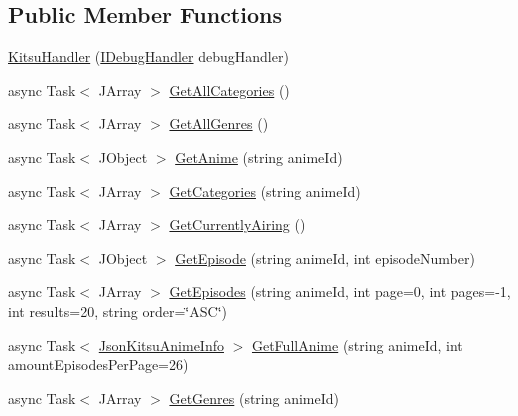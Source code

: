 \subsection*{Public Member Functions}
\begin{DoxyCompactItemize}
\item 
\mbox{\hyperlink{class_little_weeb_library_1_1_handlers_1_1_kitsu_handler_a92f980060f9277a512dfda67768a7428}{Kitsu\+Handler}} (\mbox{\hyperlink{interface_little_weeb_library_1_1_handlers_1_1_i_debug_handler}{I\+Debug\+Handler}} debug\+Handler)
\item 
async Task$<$ J\+Array $>$ \mbox{\hyperlink{class_little_weeb_library_1_1_handlers_1_1_kitsu_handler_ae329f7e735a6abee2734bbbd13d121b2}{Get\+All\+Categories}} ()
\item 
async Task$<$ J\+Array $>$ \mbox{\hyperlink{class_little_weeb_library_1_1_handlers_1_1_kitsu_handler_a528491d8d97584b2ba2c3bfcc4b5772e}{Get\+All\+Genres}} ()
\item 
async Task$<$ J\+Object $>$ \mbox{\hyperlink{class_little_weeb_library_1_1_handlers_1_1_kitsu_handler_a4c88ed25befe2904416b4d90673a8f82}{Get\+Anime}} (string anime\+Id)
\item 
async Task$<$ J\+Array $>$ \mbox{\hyperlink{class_little_weeb_library_1_1_handlers_1_1_kitsu_handler_a8d6a49dd26f66dd33ea2e2b4e9b330cb}{Get\+Categories}} (string anime\+Id)
\item 
async Task$<$ J\+Array $>$ \mbox{\hyperlink{class_little_weeb_library_1_1_handlers_1_1_kitsu_handler_af733f442659b7789588da55b00c065c4}{Get\+Currently\+Airing}} ()
\item 
async Task$<$ J\+Object $>$ \mbox{\hyperlink{class_little_weeb_library_1_1_handlers_1_1_kitsu_handler_a3129d77267b0fb879e3f8f1a8e83494a}{Get\+Episode}} (string anime\+Id, int episode\+Number)
\item 
async Task$<$ J\+Array $>$ \mbox{\hyperlink{class_little_weeb_library_1_1_handlers_1_1_kitsu_handler_a615caf4bea96465d35eb36434bc71bea}{Get\+Episodes}} (string anime\+Id, int page=0, int pages=-\/1, int results=20, string order=\char`\"{}A\+SC\char`\"{})
\item 
async Task$<$ \mbox{\hyperlink{class_little_weeb_library_1_1_models_1_1_json_kitsu_anime_info}{Json\+Kitsu\+Anime\+Info}} $>$ \mbox{\hyperlink{class_little_weeb_library_1_1_handlers_1_1_kitsu_handler_a5f655ed8b3e26f6d6767e090eea9e3bb}{Get\+Full\+Anime}} (string anime\+Id, int amount\+Episodes\+Per\+Page=26)
\item 
async Task$<$ J\+Array $>$ \mbox{\hyperlink{class_little_weeb_library_1_1_handlers_1_1_kitsu_handler_aabd039f9220f03f5c9dcf83e104531b1}{Get\+Genres}} (string anime\+Id)

\end{DoxyCompactItemize}
